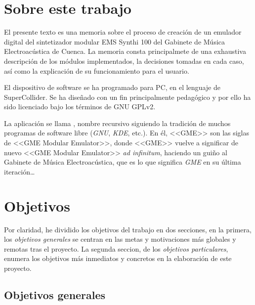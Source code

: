 \section{Sobre este trabajo}

El presente texto es una memoria sobre el proceso de creación de un emulador digital del sintetizador modular EMS Synthi 100 del Gabinete de Música Electroacústica de Cuenca. La memoria consta principalmete de una exhaustiva descripción de los módulos implementados, la decisiones tomadas en cada caso, así como la explicación de su funcionamiento para el usuario.

El dispositivo de software se ha programado para PC, en el lenguaje de SuperCollider. Se ha diseñado con un fin principalmente pedagógico y por ello ha sido licenciado bajo los términos de GNU GPLv2. 

La aplicación se llama \appName, nombre recursivo siguiendo la tradición de muchos programas de software libre (\textit{GNU}, \textit{KDE}, etc.). En él, <<GME>> son las siglas de <<GME Modular Emulator>>, donde <<GME>> vuelve a significar de nuevo <<GME Modular Emulator>> \textit{ad infinitum}, haciendo un guiño al Gabinete de Música Electroacústica, que es lo que significa \textit{GME} en su última iteración\dots


\section{Objetivos}

Por claridad, he dividido los objetivos del trabajo en dos secciones, en la primera, los \textit{objetivos generales} se centran en las metas y motivaciones más globales y remotas tras el proyecto. La segunda seccion, de los \textit{objetivos particulares}, enumera los objetivos más inmediatos y concretos en la elaboración de este proyecto.


\subsection{Objetivos generales}



